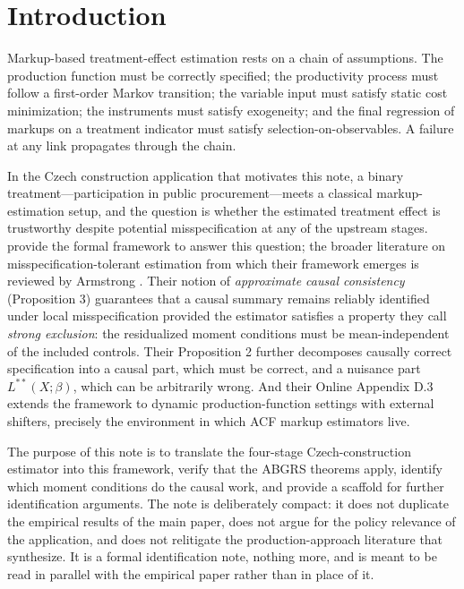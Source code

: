 \documentclass[11pt]{article}
\begin{document}
\section{Introduction}\label{sec:intro}

Markup-based treatment-effect estimation rests on a chain of assumptions. The production function must be correctly specified; the productivity process must follow a first-order Markov transition; the variable input must satisfy static cost minimization; the instruments must satisfy exogeneity; and the final regression of markups on a treatment indicator must satisfy selection-on-observables. A failure at any link propagates through the chain.

In the Czech construction application that motivates this note, a binary treatment---participation in public procurement---meets a classical markup-estimation setup, and the question is whether the estimated treatment effect is trustworthy despite potential misspecification at any of the upstream stages. \citet{ABGRS2025} provide the formal framework to answer this question; the broader literature on misspecification-tolerant estimation from which their framework emerges is reviewed by Armstrong \cite{Armstrong2025}. Their notion of \emph{approximate causal consistency} (Proposition 3) guarantees that a causal summary remains reliably identified under local misspecification provided the estimator satisfies a property they call \emph{strong exclusion}: the residualized moment conditions must be mean-independent of the included controls. Their Proposition 2 further decomposes causally correct specification into a causal part, which must be correct, and a nuisance part $L^{**}(X;\beta)$, which can be arbitrarily wrong. And their Online Appendix D.3 extends the framework to dynamic production-function settings with external shifters, precisely the environment in which ACF \citep{ACF2015} markup estimators live.

The purpose of this note is to translate the four-stage Czech-construction estimator into this framework, verify that the ABGRS theorems apply, identify which moment conditions do the causal work, and provide a scaffold for further identification arguments. The note is deliberately compact: it does not duplicate the empirical results of the main paper, does not argue for the policy relevance of the application, and does not relitigate the production-approach literature that \citet{DLS2021} synthesize. It is a formal identification note, nothing more, and is meant to be read in parallel with the empirical paper rather than in place of it.
\end{document}
